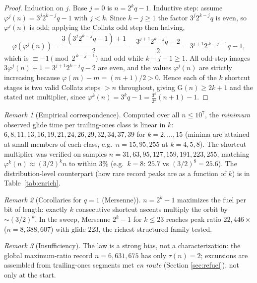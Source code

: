 \documentclass[11pt]{article}
\theoremstyle{remark}
\newtheorem{remark}{Remark}
\begin{document}
\begin{proof}
Induction on $j$. Base $j = 0$ is $n = 2^k q - 1$. Inductive step:
assume $\varphi^j(n) = 3^j 2^{k-j} q - 1$ with $j < k$. Since $k - j \ge 1$
the factor $3^j 2^{k-j} q$ is even, so $\varphi^j(n)$ is odd; applying the
Collatz odd step then halving,
\[
  \varphi(\varphi^j(n)) = \frac{3\,(3^j 2^{k-j} q - 1) + 1}{2}
  = \frac{3^{j+1} 2^{k-j} q - 2}{2}
  = 3^{j+1} 2^{\,k-j-1} q - 1,
\]
which is $\equiv -1 \pmod{2^{\,k-j-1}}$ and odd while $k - j - 1 \ge 1$.
All odd-step images $3\varphi^j(n) + 1 = 3^{j+1} 2^{k-j} q - 2$ are even,
and the values $\varphi^j(n)$ are strictly increasing because
$\varphi(m) - m = (m+1)/2 > 0$. Hence each of the $k$ shortcut stages is
two valid Collatz steps $> n$ throughout, giving $\mathrm{G}(n) \ge 2k + 1$
and the stated net multiplier, since
$\varphi^k(n) = 3^k q - 1 = \frac{3^k}{2^k}(n + 1) - 1$.
\end{proof}

\begin{remark}[Empirical correspondence]
\label{rem:empiricalfuel}
Computed over all $n \le 10^7$, the \emph{minimum} observed glide time per
trailing-ones class is linear in $k$: $6, 8, 11, 13, 16, 19, 21, 24, 26,
29, 32, 34, 37, 39$ for $k = 2, \dots, 15$ (minima are attained at small
members of each class, e.g.\ $n = 15, 95, 255$ at $k = 4, 5, 8$). The
shortcut multiplier was verified on
samples $n = 31, 63, 95, 127, 159, 191, 223, 255$, matching
$\varphi^k(n) \approx (3/2)^k n$ to within $3\%$ (e.g.\ $k=8$: $25.7$ vs
$(3/2)^8 = 25.6$). The distribution-level counterpart (how rare record
peaks are as a function of $k$) is in Table~\ref{tab:enrich}.
\end{remark}

\begin{remark}[Corollaries for $q = 1$ (Mersenne)]
$n = 2^k - 1$ maximizes the fuel per bit of length: exactly $k$ consecutive
shortcut ascents multiply the orbit by $\sim (3/2)^k$. In the sweep,
Mersenne $2^k - 1$ for $k \le 23$ reaches peak ratio $22{,}446\times$
($n = 8{,}388{,}607$) with glide $223$, the richest structured family
tested.
\end{remark}

\begin{remark}[Insufficiency]
The law is a strong bias, not a characterization: the global maximum-ratio
record $n = 6{,}631{,}675$ has only $\tau(n) = 2$; excursions are assembled
from trailing-ones segments met \emph{en route} (Section
\ref{sec:refuel}), not only at the start.
\end{remark}
\end{document}
